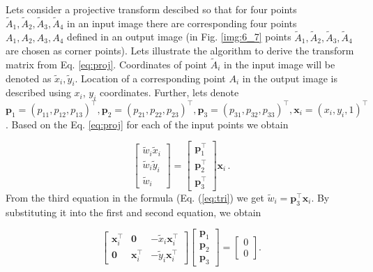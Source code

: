 \documentclass[12pt]{article}
\def\mvec#1{\mathbf{#1}}
\begin{document}
Lets consider a projective transform descibed so that for four points $\tilde{A}_{1} ,\tilde{A}_{2} ,\tilde{A}_{3} ,\tilde{A}_{4}$
in an input image there are corresponding four points $A_{1} ,A_{2}, A_{3}, A_{4}$ defined in an output image
(in Fig. \ref{img:6_7} points $\tilde{A}_{1}, \tilde{A}_{2}, \tilde{A}_{3}, \tilde{A}_{4}$ are chosen as corner points).
Lets illustrate the algorithm to derive the transform matrix from Eq. \eqref{eq:proj}.
Coordinates of point $\tilde{A}_{i}$ in the input image will be denoted as $\tilde{x}_{i}, \tilde{y}_{i}$.
Location of a corresponding point $A_i$ in the output image is described using $x_i$, $y_i$ coordinates.
Further, lets denote $\mathbf{p}_1 = (p_{11}, p_{12}, p_{13})^\top, \mathbf{p}_2 = (p_{21}, p_{22}, p_{23})^\top, \mathbf{p}_3 = (p_{31}, p_{32}, p_{33})^\top, \mathbf{x}_i = (x_i, y_i, 1)^\top$.
Based on the Eq. \eqref{eq:proj} for each of the input points we obtain 

\begin{equation}
    \label{eq:tri}
\left[\begin{array}{c} {\tilde{w}_{i} \tilde{x}_{i} } \\ {\tilde{w}_{i} \tilde{y}_{i} } \\ {\tilde{w}_{i} } \end{array}\right]=\left[\begin{array}{c} {\mvec{p}_{1}^\top} \\ {\mvec{p}_{2}^\top} \\ {\mvec{p}_{3}^\top} \end{array}\right]\mvec{x}_{i} \, .
\end{equation}
From the third equation in the formula (Eq. (\ref{eq:tri}) we get $\tilde{w}_{i} = \mathbf{p}_3^\top \mathbf{x}_{i}$.
By substituting it into the first and second equation, we obtain

\begin{equation}
    \label{eq:our_proj}
    \left[
    \begin{array}{ccc}
    \mathbf{x}_i^\top & \mathbf{0} & -\tilde{x}_i \mathbf{x}_i^\top \\
    \mathbf{0} & \mathbf{x}_i^\top & -\tilde{y}_i \mathbf{x}_i^\top
    \end{array}
    \right]
    \left[
    \begin{array}{c}
    \mathbf{p}_1 \\
    \mathbf{p}_2 \\
    \mathbf{p}_3
    \end{array}
    \right]
    =
    \left[
    \begin{array}{c}
    0 \\ 0
    \end{array}
    \right].
\end{equation}
\end{document}
